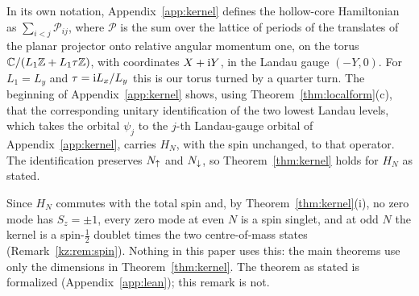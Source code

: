 \begin{remark}\label{rem:kernel-identification}
In its own notation, Appendix~\ref{app:kernel} defines the hollow-core Hamiltonian as $\sum_{i<j}\mathcal P_{ij}$, where $\mathcal P$ is the sum over
the lattice of periods of the translates of the planar projector onto relative angular momentum one, on the torus
$\mathbb{C}/(L_1\mathbb{Z}+L_1\tau\mathbb{Z})$, with coordinates $X+\mathrm{i} Y$, in the Landau gauge $(-Y,0)$. For $L_1=L_y$ and $\tau=\mathrm{i} L_x/L_y$ this is our torus turned by a
quarter turn. The beginning of Appendix~\ref{app:kernel} shows, using Theorem~\ref{thm:localform}(c), that the
corresponding unitary identification of the two lowest Landau levels, which takes the orbital $\psi_j$ to the $j$-th
Landau-gauge orbital of Appendix~\ref{app:kernel}, carries $H_N$, with the spin unchanged, to that operator. The
identification preserves $N_{\uparrow}$ and $N_{\downarrow}$, so Theorem~\ref{thm:kernel} holds for $H_N$ as stated.
\end{remark}

\begin{remark}[spin]\label{rem:spin}
Since $H_N$ commutes with the total spin and, by Theorem~\ref{thm:kernel}(i), no zero mode has $S_z=\pm1$, every zero mode at
even $N$ is a spin singlet, and at odd $N$ the kernel is a spin-$\tfrac12$ doublet times the two centre-of-mass states
(Remark~\ref{kz:rem:spin}). Nothing in this paper uses this: the main theorems use only the dimensions in
Theorem~\ref{thm:kernel}. The theorem as stated is formalized (Appendix~\ref{app:lean}); this remark is not.
\end{remark}
